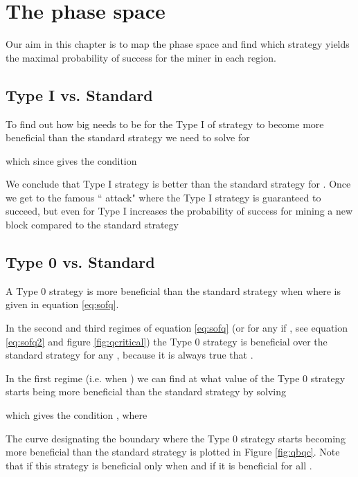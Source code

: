 \documentclass[letterpaper,12pt]{report}
\begin{document}
\chapter{The  phase space}\label{chap:gqphase}

Our aim in this chapter is to map the  phase space and find which strategy yields the maximal probability of success for the miner in each region.

\section{Type I vs. Standard}\label{TypeIoverStandard}
To find out how big  needs to be for the Type I of strategy to become more beneficial than the standard strategy we need to solve for 



which since  gives the condition 


We conclude that Type I strategy is better than the standard strategy for . Once  we get to the famous `` attack" where the Type I strategy is guaranteed to succeed, but even for  Type I increases the probability of success for mining a new block compared to the standard strategy

\section{Type 0 vs. Standard}\label{Type0overStandard}

A Type 0 strategy is more beneficial than the standard strategy when  where  is given in equation \ref{eq:sofq}. 

In the second and third regimes of equation \ref{eq:sofq} (or for any  if , see equation \ref{eq:sofq2} and figure \ref{fig:qcritical}) the Type 0 strategy is beneficial over the standard strategy for any , because it is always true that . 

In the first regime (i.e. when ) we can find at what value of  the Type 0 strategy starts being more beneficial than the standard strategy by solving


which gives the condition , where 



The curve  designating the boundary where the Type 0 strategy starts becoming more beneficial than the standard strategy is plotted in Figure \ref{fig:qbqc}.
Note that if  this strategy is beneficial only when  and if  it is beneficial for all .

\noindent \begin{minipage}{\linewidth}
\label{fig:qbqc}
\end{minipage}
\linebreak
\end{document}
